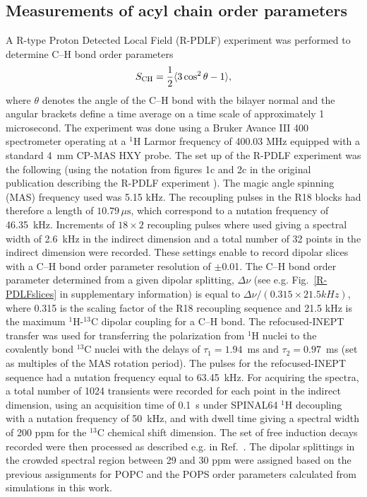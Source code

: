 \documentclass[journal=jctcce,manuscript=article]{achemso}
\begin{document}
\subsection{Measurements of acyl chain order parameters}
A R-type Proton Detected Local Field (R-PDLF) experiment was performed to determine C--H bond order
parameters
\begin{equation}\label{OPequation}
  S_{\rm{CH}}=\frac{1}{2}\langle3\cos^2\theta-1\rangle,
\end{equation}
  where $\theta$ denotes the angle of the C--H bond
with the bilayer normal and the angular brackets define a time average on a time scale of approximately 1 microsecond.
The experiment was done using a Bruker Avance III 400 spectrometer operating at a $^1$H Larmor frequency of 400.03 MHz
equipped with a standard 4~mm CP-MAS HXY probe. The set up of the R-PDLF experiment was the following
(using the notation from figures 1c and 2c in the original publication describing the R-PDLF experiment \cite{dvinskikh04}).
The magic angle spinning (MAS) frequency used was 5.15 kHz. The recoupling pulses in the R18 blocks had
therefore a length of $10.79 \, \mu \mathrm{s}$, which correspond to a nutation frequency of 46.35~kHz. Increments of $18 \times 2$ recoupling
pulses where used giving a spectral width of 2.6~kHz in the indirect dimension and a total number of 32 points in
the indirect dimension were recorded. These settings enable to record dipolar slices with a C--H bond order parameter
resolution of $\pm$0.01. The C--H bond order parameter determined from a given dipolar
splitting, $\Delta\nu$ (see e.g. Fig.~\ref{R-PDLFslices} in supplementary information) is equal to $\Delta\nu/(0.315\times21.5 kHz)$, where 0.315 is
the scaling factor of the R18 recoupling sequence and 21.5 kHz is the maximum $^1$H-$^{13}$C dipolar coupling for a C--H bond.
The refocused-INEPT transfer \cite{morris79,burum80} 
was used for transferring the polarization from $^1$H nuclei to the covalently bond $^{13}$C nuclei with the delays of $\tau_1 = 1.94$~ms and $\tau_2 = 0.97$~ms
(set as multiples of the MAS rotation period). The pulses for the refocused-INEPT sequence had a nutation frequency equal to 63.45~kHz.
For acquiring the spectra, a total number of 1024 transients were recorded for each point in the indirect dimension, using an acquisition
time of 0.1~s under SPINAL64 $^1$H decoupling \cite{fung00} with a nutation frequency of 50~kHz, and with dwell time giving a spectral
width of 200 ppm for the $^{13}$C chemical shift dimension. The set of free induction decays recorded were then processed as
described e.g. in Ref.~. The dipolar splittings in the crowded spectral region
between 29 and 30 ppm were assigned based on the previous assignments for POPC \cite{ferreira13} 
and the POPS order parameters calculated from simulations in this work.
\end{document}

